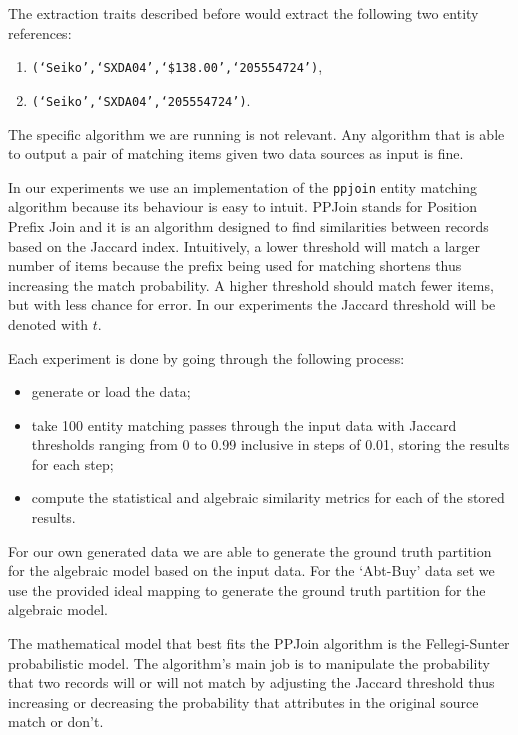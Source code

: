 \documentclass[11pt]{article}
\begin{document}
    The extraction traits described before would extract the following two
    entity references:
    \begin{enumerate}
        \item \texttt{(`Seiko',`SXDA04',`\$138.00',`205554724')},
        \item \texttt{(`Seiko',`SXDA04',`205554724')}.
    \end{enumerate}

    The specific algorithm we are running is not relevant.
    Any algorithm that is able to output a pair of matching items given two
    data sources as input is fine.
    
    In our experiments we use an implementation of the
    \texttt{ppjoin}\cite{ppjoin} entity matching algorithm because its behaviour
    is easy to intuit.
    PPJoin stands for Position Prefix Join and it is an algorithm designed to
    find similarities between records based on the Jaccard
    index\cite{jaccard1912,finley1996}.
    Intuitively, a lower threshold will match a larger number of items because
    the prefix being used for matching shortens thus increasing the match
    probability.
    A higher threshold should match fewer items, but with less chance for error.
    In our experiments the Jaccard threshold will be denoted with $t$.

    Each experiment is done by going through the following process:

    \begin{itemize}
        \item generate or load the data;
        \item take 100 entity matching passes through the input data with
              Jaccard thresholds ranging from 0 to 0.99 inclusive in steps of
              0.01, storing the results for each step;
        \item compute the statistical and algebraic similarity metrics for each
              of the stored results.
    \end{itemize}

    For our own generated data we are able to generate the ground truth
    partition for the algebraic model based on the input data.
    For the `Abt-Buy' data set we use the provided ideal mapping to generate the
    ground truth partition for the algebraic model.
    
    The mathematical model that best fits the PPJoin algorithm is the
    Fellegi-Sunter probabilistic model.
    The algorithm's main job is to manipulate the probability that two records
    will or will not match by adjusting the Jaccard threshold thus increasing or
    decreasing the probability that attributes in the original source match or
    don't.
\end{document}
